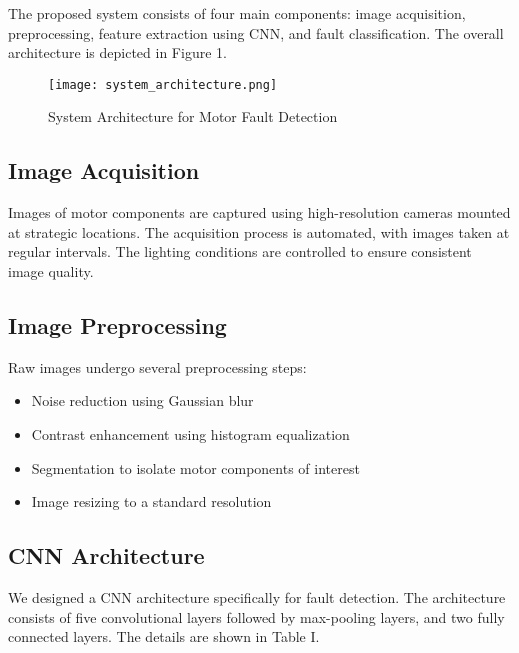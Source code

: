 \documentclass[conference]{IEEEtran}
\begin{document}
The proposed system consists of four main components: image acquisition, preprocessing, feature extraction using CNN, and fault classification. The overall architecture is depicted in Figure 1.

\begin{figure}[H]
    \centering
    \texttt{[image: system\_architecture.png]}
    \caption{System Architecture for Motor Fault Detection}
    \label{fig:system_arch}
\end{figure}

\subsection{Image Acquisition}

Images of motor components are captured using high-resolution cameras mounted at strategic locations. The acquisition process is automated, with images taken at regular intervals. The lighting conditions are controlled to ensure consistent image quality.

\subsection{Image Preprocessing}

Raw images undergo several preprocessing steps:
\begin{itemize}
    \item Noise reduction using Gaussian blur
    \item Contrast enhancement using histogram equalization
    \item Segmentation to isolate motor components of interest
    \item Image resizing to a standard resolution
\end{itemize}

\subsection{CNN Architecture}

We designed a CNN architecture specifically for fault detection. The architecture consists of five convolutional layers followed by max-pooling layers, and two fully connected layers. The details are shown in Table I.
\end{document}
